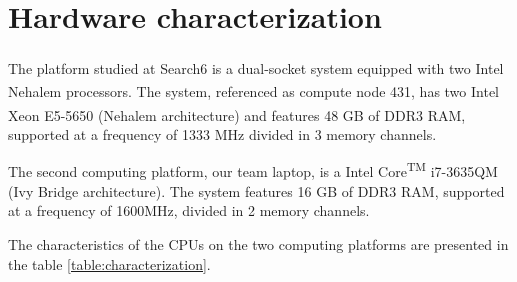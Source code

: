 \documentclass{sigplanconf}
\begin{document}
\section{Hardware characterization}
The platform studied at Search6 is a dual-socket system equipped with two
Intel\textsuperscript{\textregistered} Nehalem processors.
The system, referenced as compute node
431, has two Intel\textsuperscript{\textregistered} Xeon\textsuperscript{\textregistered} E5-5650 (Nehalem architecture) and features 48 GB of DDR3 RAM, supported at a frequency of 1333 MHz divided in 3 memory channels. \par 

The second computing platform, our team laptop, is a  Intel\textsuperscript{\textregistered} Core\textsuperscript{TM} i7-3635QM (Ivy Bridge architecture). The system features 16 GB of DDR3 RAM, supported at a frequency of 1600MHz, divided in 2 memory channels. \par 

The characteristics of the CPUs on the two computing platforms are presented in the table \ref{table:characterization}.
\end{document}
